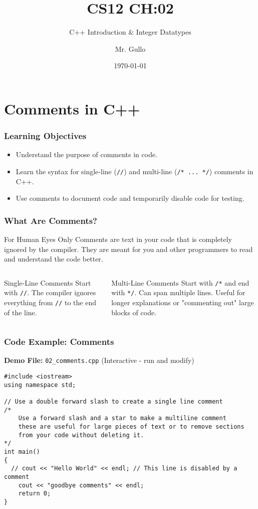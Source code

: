 \documentclass{beamer}
\title[Integer Datatypes]{CS12 CH:02}
\subtitle{C++ Introduction \& Integer Datatypes}
\author[Mr. Gullo]{Mr. Gullo}
\date[\today]{\today}
\begin{document}
\frame{\titlepage}

\section{Comments in C++}

\begin{frame}
\frametitle{Learning Objectives}
\begin{itemize}
    \item Understand the purpose of comments in code.\pause
    \item Learn the syntax for single-line (\texttt{//}) and multi-line (\texttt{/* ... */}) comments in C++.\pause
    \item Use comments to document code and temporarily disable code for testing.
\end{itemize}
\end{frame}

\begin{frame}
\frametitle{What Are Comments?}
\begin{block}{For Human Eyes Only}
Comments are text in your code that is completely ignored by the compiler. They are meant for you and other programmers to read and understand the code better.
\end{block}
\pause

\begin{columns}[T]
    \begin{column}{0.5\textwidth}
        \begin{alertblock}{Single-Line Comments}
        Start with \texttt{//}. The compiler ignores everything from \texttt{//} to the end of the line.
        \end{alertblock}
    \end{column}\pause
    \begin{column}{0.5\textwidth}
        \begin{exampleblock}{Multi-Line Comments}
        Start with \texttt{/*} and end with \texttt{*/}. Can span multiple lines. Useful for longer explanations or "commenting out" large blocks of code.
        \end{exampleblock}
    \end{column}
\end{columns}
\end{frame}

\begin{frame}[fragile]
\frametitle{Code Example: Comments}
\textbf{Demo File:} \texttt{02\_comments.cpp} (Interactive - run and modify)
\begin{verbatim}
#include <iostream>
using namespace std;

// Use a double forward slash to create a single line comment
/*
    Use a forward slash and a star to make a multiline comment
    these are useful for large pieces of text or to remove sections
    from your code without deleting it.
*/
int main()
{
  // cout << "Hello World" << endl; // This line is disabled by a comment
    cout << "goodbye comments" << endl;
    return 0;
}
\end{verbatim}
\end{frame}
\end{document}
